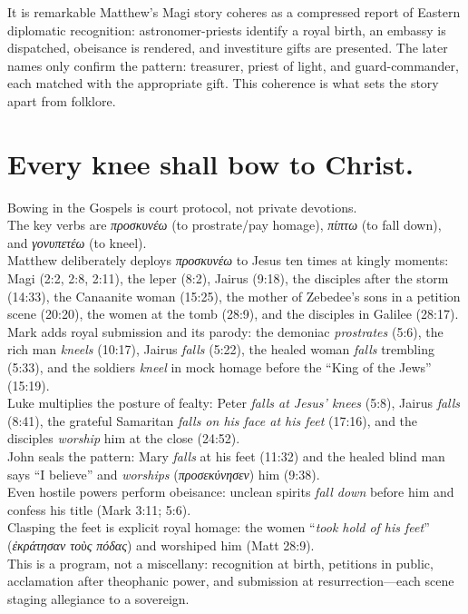 It is remarkable Matthew’s Magi story coheres as a compressed report of Eastern diplomatic recognition: astronomer-priests identify a royal birth, an embassy is dispatched, obeisance is rendered, and investiture gifts are presented.
The later names only confirm the pattern: treasurer, priest of light, and guard-commander, each matched with the appropriate gift.
This coherence is what sets the story apart from folklore.

\section{Every knee shall bow to Christ.}\label{sec:every-knee-shall-bow-to-christ.}

Bowing in the Gospels is court protocol, not private devotions.\\
The key verbs are \emph{προσκυνέω} (to prostrate/pay homage), \emph{πίπτω} (to fall down), and \emph{γονυπετέω} (to kneel).\\
Matthew deliberately deploys \emph{προσκυνέω} to Jesus ten times at kingly moments: Magi (2:2, 2:8, 2:11), the leper (8:2), Jairus (9:18), the disciples after the storm (14:33), the Canaanite woman (15:25), the mother of Zebedee’s sons in a petition scene (20:20), the women at the tomb (28:9), and the disciples in Galilee (28:17).\\
Mark adds royal submission and its parody: the demoniac \emph{prostrates} (5:6), the rich man \emph{kneels} (10:17), Jairus \emph{falls} (5:22), the healed woman \emph{falls} trembling (5:33), and the soldiers \emph{kneel} in mock homage before the “King of the Jews” (15:19).\\
Luke multiplies the posture of fealty: Peter \emph{falls at Jesus’ knees} (5:8), Jairus \emph{falls} (8:41), the grateful Samaritan \emph{falls on his face at his feet} (17:16), and the disciples \emph{worship} him at the close (24:52).\\
John seals the pattern: Mary \emph{falls} at his feet (11:32) and the healed blind man says “I believe” and \emph{worships} (\emph{προσεκύνησεν}) him (9:38).\\
Even hostile powers perform obeisance: unclean spirits \emph{fall down} before him and confess his title (Mark 3:11; 5:6).\\
Clasping the feet is explicit royal homage: the women “\emph{took hold of his feet}” (\emph{ἐκράτησαν τοὺς πόδας}) and worshiped him (Matt 28:9).\\
This is a program, not a miscellany: recognition at birth, petitions in public, acclamation after theophanic power, and submission at resurrection---each scene staging allegiance to a sovereign.\\

